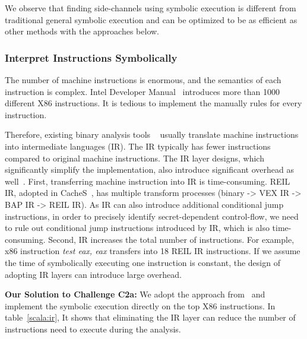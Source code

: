 We observe that finding side-channels using symbolic execution is different from 
traditional general symbolic execution and can be optimized to be as efficient as other
methods with the approaches  below.

\subsubsection{Interpret Instructions Symbolically}

The number of machine instructions is enormous, and the semantics of each instruction is complex. 
Intel Developer Manual~\cite{intelsys}
introduces more than 1000 different X86 instructions. 
It is tedious to implement the manually
rules for every instruction.

Therefore, existing binary analysis tools 
~\cite{shoshitaishvili2016state, 10.1007/978-3-642-22110-1_37} 
usually translate machine instructions into intermediate languages (IR). 
The IR typically has fewer instructions compared to original machine instructions. 
The IR layer designs, which significantly
simplify the implementation, also introduce significant overhead as well~\cite{217563}. First, transferring machine
instruction into IR is time-consuming. REIL IR, adopted in
CacheS~\cite{236338}, has multiple transform processes (binary -> VEX IR -> BAP IR -> REIL IR).
As IR can also introduce additional conditional jump instructions,
in order to precisely identify secret-dependent control-flow,
we need to rule out conditional jump instructions introduced by
IR, which is also time-consuming. Second, IR increases the total
number of instructions. For example, x86 instruction \textit{test eax, eax} 
transfers into 18 REIL IR instructions. If we assume the time of symbolically executing 
one instruction is constant, the design of adopting IR layers can introduce large overhead. 

\vspace*{2pt}
\textbf{Our Solution to Challenge C2a:}
We adopt the approach from~\cite{217563} and implement the symbolic execution 
directly on the top X86 instructions. In table~\ref{scala:ir}, 
It shows that eliminating the IR layer can reduce the number
of instructions need to execute during the analysis.

